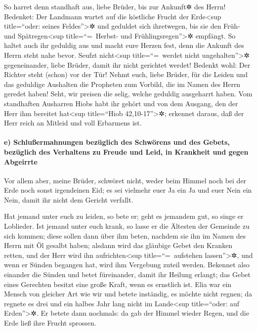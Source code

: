  So harret denn standhaft aus, liebe Brüder, bis zur
Ankunft✲ des Herrn! Bedenket: Der Landmann wartet auf die köstliche
Frucht der Erde\textless sup title=``oder: seines Feldes''\textgreater✲
und geduldet sich ihretwegen, bis sie den Früh- und
Spätregen\textless sup title=``=~Herbst- und
Frühlingsregen''\textgreater✲ empfängt.  So haltet auch
ihr geduldig aus und macht eure Herzen fest, denn die Ankunft des Herrn
steht nahe bevor.  Seufzt nicht\textless sup
title=``=~werdet nicht ungehalten''\textgreater✲ gegeneinander, liebe
Brüder, damit ihr nicht gerichtet werdet! Bedenkt wohl: Der Richter
steht (schon) vor der Tür!  Nehmt euch, liebe Brüder, für
die Leiden und das geduldige Aushalten die Propheten zum Vorbild, die im
Namen des Herrn geredet haben!  Seht, wir preisen die
selig, welche geduldig ausgeharrt haben. Vom standhaften Ausharren Hiobs
habt ihr gehört und von dem Ausgang, den der Herr ihm bereitet
hat\textless sup title=``Hiob 42,10-17''\textgreater✲; erkennet daraus,
daß der Herr reich an Mitleid und voll Erbarmens ist.

\hypertarget{e-schluuxdfermahnungen-bezuxfcglich-des-schwuxf6rens-und-des-gebets-bezuxfcglich-des-verhaltens-zu-freude-und-leid-in-krankheit-und-gegen-abgeirrte}{%
\paragraph{e) Schlußermahnungen bezüglich des Schwörens und des Gebets,
bezüglich des Verhaltens zu Freude und Leid, in Krankheit und gegen
Abgeirrte}\label{e-schluuxdfermahnungen-bezuxfcglich-des-schwuxf6rens-und-des-gebets-bezuxfcglich-des-verhaltens-zu-freude-und-leid-in-krankheit-und-gegen-abgeirrte}}

 Vor allem aber, meine Brüder, schwöret nicht, weder beim
Himmel noch bei der Erde noch sonst irgendeinen Eid; es sei vielmehr
euer Ja ein Ja und euer Nein ein Nein, damit ihr nicht dem Gericht
verfallt.

 Hat jemand unter euch zu leiden, so bete er; geht es
jemandem gut, so singe er Loblieder.  Ist jemand unter
euch krank, so lasse er die Ältesten der Gemeinde zu sich kommen; diese
sollen dann über ihm beten, nachdem sie ihn im Namen des Herrn mit Öl
gesalbt haben;  alsdann wird das gläubige Gebet den
Kranken retten, und der Herr wird ihn aufrichten\textless sup
title=``=~aufstehen lassen''\textgreater✲, und wenn er Sünden begangen
hat, wird ihm Vergebung zuteil werden.  Bekennet also
einander die Sünden und betet füreinander, damit ihr Heilung erlangt;
das Gebet eines Gerechten besitzt eine große Kraft, wenn es ernstlich
ist.  Elia war ein Mensch von gleicher Art wie wir und
betete inständig, es möchte nicht regnen; da regnete es drei und ein
halbes Jahr lang nicht im Lande\textless sup title=``oder: auf
Erden''\textgreater✲.  Er betete dann nochmals: da gab
der Himmel wieder Regen, und die Erde ließ ihre Frucht sprossen.

